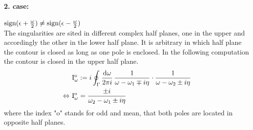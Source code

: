 \paragraph{2. case:} $\operatorname{sign}(\epsilon + \frac{\omega}{2}) \neq \operatorname{sign}(\epsilon - \frac{\omega}{2})$\\
%
The singularities are sited in different complex half planes, one in the upper and accordingly the other in the lower half plane.
It is arbitrary in which half plane the contour is closed as long as one pole is enclosed.
In the following computation the contour is closed in the upper half plane.
%
\begin{align}
	&\mathrm{I}_{\omega}^{\mathrm{o}} := i \oint_{\Gamma} \frac{\dd{\omega}}{2\pi i}\, \frac{1}{\omega - \omega_{1} \mp i\eta} \cdot \frac{1}{\omega - \omega_{2} \pm i\eta}
	\notag \\
	\Leftrightarrow\ &\mathrm{I}_{\omega}^{\mathrm{o}} = \frac{\pm i}{\omega_{2} - \omega_{1} \pm i\eta}
\end{align}
%
where the index "o" stands for odd and mean, that both poles are located in opposite half planes.

